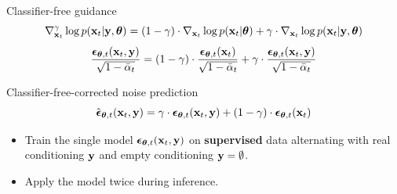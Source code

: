 \begin{frame}{Classifier-free guidance}
	\[
		\nabla_{\mathbf{x}_t}^{\gamma} \log p(\mathbf{x}_t | \mathbf{y}, \boldsymbol{\theta}) =  (1 - \gamma) \cdot  \nabla_{\mathbf{x}_t} \log p(\mathbf{x}_t | \boldsymbol{\theta}) + \gamma \cdot  \nabla_{\mathbf{x}_t} \log p(\mathbf{x}_t| \mathbf{y}, \boldsymbol{\theta})
	\]
	\[
		\frac{\boldsymbol{\epsilon}_{\boldsymbol{\theta}, t}(\mathbf{x}_t, \mathbf{y})}{\sqrt{1 - \bar{\alpha}_t}} = (1 - \gamma) \cdot  \frac{\boldsymbol{\epsilon}_{\boldsymbol{\theta}, t}(\mathbf{x}_t)}{\sqrt{1 - \bar{\alpha}_t}} +  \gamma \cdot \frac{\boldsymbol{\epsilon}_{\boldsymbol{\theta}, t}(\mathbf{x}_t, \mathbf{y})}{\sqrt{1 - \bar{\alpha}_t}} 
	\]
	\begin{block}{Classifier-free-corrected noise prediction}
		\vspace{-0.3cm}
		\[
			\hat{\boldsymbol{\epsilon}}_{\boldsymbol{\theta}, t}(\mathbf{x}_t, \mathbf{y}) = \gamma \cdot \boldsymbol{\epsilon}_{\boldsymbol{\theta}, t}(\mathbf{x}_t, \mathbf{y}) + (1 - \gamma) \cdot \boldsymbol{\epsilon}_{\boldsymbol{\theta}, t}(\mathbf{x}_t)
		\]
		\vspace{-0.5cm}
	\end{block}
	\begin{itemize}
		\item Train the single model $\boldsymbol{\epsilon}_{\boldsymbol{\theta}, t}(\mathbf{x}_t, \mathbf{y})$ on \textbf{supervised} data alternating with real conditioning $\mathbf{y}$ and empty conditioning $\mathbf{y} = \emptyset$.
		\item Apply the model twice during inference.
	\end{itemize}
\end{frame}

